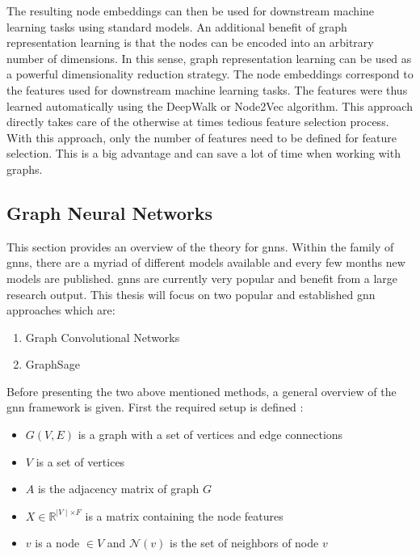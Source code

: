 	\noindent The resulting node embeddings can then be used for downstream
	machine learning tasks using standard models. An additional benefit of 
	graph representation learning is that the nodes can be encoded into an 
	arbitrary number of dimensions. In this sense, graph representation 
	learning can be used as a powerful dimensionality reduction strategy. 
	The node embeddings correspond to the features used for downstream 
	machine learning tasks. The features were thus learned automatically using 
	the DeepWalk or Node2Vec algorithm. This approach directly takes care of the 
	otherwise at times tedious feature selection process. With this approach, 
	only the number of features need to be defined for feature selection. This 
	is a big advantage and can save a lot of time when working with graphs. 

	\subsection{Graph Neural Networks}
	\label{section:GNN_theory}

	This section provides an overview of the theory for \acl{gnn}s. Within the 
	family of \acs{gnn}s, there are a myriad of different models 
	available and every few months new models are published. \acs{gnn}s are 
	currently very popular and benefit from a large research output. This thesis will 
	focus on two popular and established \acs{gnn} approaches which are:

	\begin{enumerate}
		\item Graph Convolutional Networks
		\item GraphSage
	\end{enumerate}
	
	\noindent Before presenting the two above mentioned methods, a general
	overview of the \acs{gnn} framework is given. First the required setup is
	defined \citep{leskovec2021lecture}:

	\begin{itemize}
		\setlength\itemsep{0.2em}
		\item $G(V,E)$ is a graph with a set of vertices and edge connections
		\item $V$ is a set of vertices
		\item $A$ is the adjacency matrix of graph $G$
		\item $X \in \mathbb{R}^{\mid V\mid \times F}$ is a matrix containing
			the node features
		\item $v$ is a node $\in V$ and $\mathcal{N}(v)$ is the set of 
			neighbors of node $v$
	\end{itemize}

